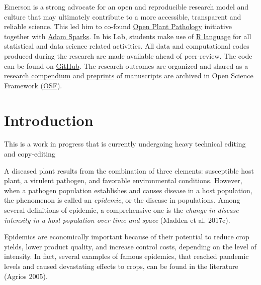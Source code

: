 \documentclass[
  letterpaper,
  DIV=11,
  numbers=noendperiod]{scrreprt}
\begin{document}
Emerson is a strong advocate for an open and reproducible research model
and culture that may ultimately contribute to a more accessible,
transparent and reliable science. This led him to co-found
\href{http://www.openplantpathology.org/}{Open Plant Pathology}
initiative together with \href{http://adamhsparks.com/}{Adam Sparks}. In
his Lab, students make use of \href{https://www.r-project.org/}{R
language} for all statistical and data science related activities. All
data and computational codes produced during the research are made
available ahead of peer-review. The code can be found on
\href{https://github.com/emdelponte}{GitHub}. The research outcomes are
organized and shared as a
\href{https://research-compendium.science/}{research compendium} and
\href{https://publicationethics.org/resources/discussion-documents/preprints}{preprints}
of manuscripts are archived in Open Science Framework
(\href{https://osf.io/jb6yd}{OSF}).


\hypertarget{introduction}{%
\chapter{Introduction}\label{introduction}}

\begin{tcolorbox}[enhanced jigsaw, rightrule=.15mm, left=2mm, breakable, colframe=quarto-callout-note-color-frame, toprule=.15mm, leftrule=.75mm, bottomrule=.15mm, colback=white, arc=.35mm, opacityback=0]
\begin{minipage}[t]{5.5mm}
\textcolor{quarto-callout-note-color}{\faInfo}
\end{minipage}%
\begin{minipage}[t]{\textwidth - 5.5mm}
This is a work in progress that is currently undergoing heavy technical
editing and copy-editing\end{minipage}%
\end{tcolorbox}

A diseased plant results from the combination of three elements:
susceptible host plant, a virulent pathogen, and favorable environmental
conditions. However, when a pathogen population establishes and causes
disease in a host population, the phenomenon is called an
\emph{epidemic}, or the disease in populations. Among several
definitions of epidemic, a comprehensive one is the \emph{change in
disease intensity in a host population over time and space} (Madden et
al. 2017c).

Epidemics are economically important because of their potential to
reduce crop yields, lower product quality, and increase control costs,
depending on the level of intensity. In fact, several examples of famous
epidemics, that reached pandemic levels and caused devastating effects
to crops, can be found in the literature (Agrios 2005).
\end{document}
